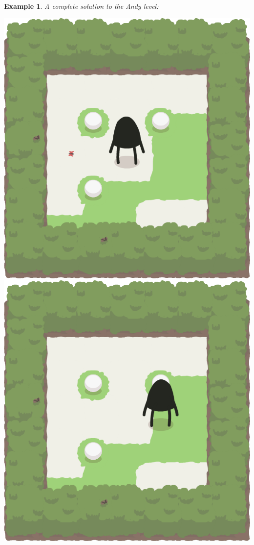 \documentclass{report}
\theoremstyle{plain}
\newtheorem{example}{Example}[section]
\begin{document}
\begin{example}
\label{ex:complete-solution}
A complete solution to the Andy level:
\begin{center}
\includegraphics[width=\andyWidth\textwidth]{andy-basic-1.png} \quad
\includegraphics[width=\andyWidth\textwidth]{andy-basic-2.png} \quad

\end{center}
\end{example}
\end{document}
